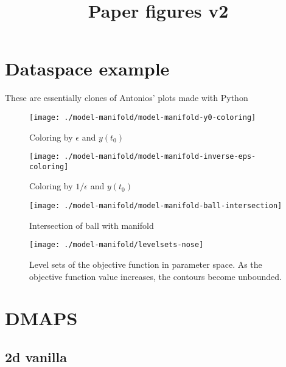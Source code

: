 \documentclass[11pt]{article}
\title{Paper figures v2}
\begin{document}
\maketitle

\section{Dataspace example}

These are essentially clones of Antonios' plots made with Python

\begin{figure}[htbp]
  \centering
  \texttt{[image: ./model-manifold/model-manifold-y0-coloring]}
  \caption{Coloring by $\epsilon$ and $y(t_0)$}
\end{figure}


\begin{figure}[htbp]
  \centering
  \texttt{[image: ./model-manifold/model-manifold-inverse-eps-coloring]}
  \caption{Coloring by $1/\epsilon$ and $y(t_0)$}
\end{figure}

\begin{figure}[htbp]
  \centering
  \texttt{[image: ./model-manifold/model-manifold-ball-intersection]}
  \caption{Intersection of ball with manifold}
\end{figure}

\begin{figure}[htbp]
  \centering
  \texttt{[image: ./model-manifold/levelsets-nose]}
  \caption{Level sets of the objective function in parameter space. As
  the objective function value increases, the contours become unbounded.}
\end{figure}

\clearpage

\section{DMAPS}

\subsection{2d vanilla}
\end{document}
